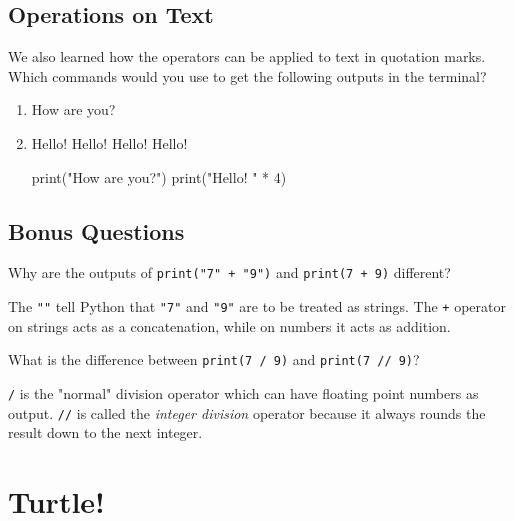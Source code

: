 \subsection{Operations on Text}

We also learned how the operators can be applied to text in quotation marks.
Which commands would you use to get the following outputs in the terminal?

\begin{enumerate}

\item How are you?
\item Hello! Hello! Hello! Hello!

\begin{solution}
    \begin{pythoncode}
print("How are you?")
print("Hello! " * 4)
    \end{pythoncode}
\end{solution}

\end{enumerate}

\subsection{Bonus Questions}

Why are the outputs of \texttt{print("7" + "9")} and \texttt{print(7 + 9)} different?

\vspace {1em}

\begin{solution}
    The \texttt{""} tell Python that \texttt{"7"} and \texttt{"9"} are to be treated as strings. The \texttt{+} operator on strings acts as a concatenation, while on numbers it acts as addition.
\end{solution}

\vspace{1em}

\noindent What is the difference between \texttt{print(7 / 9)} and \texttt{print(7 // 9)}?

\begin{solution}
    \texttt{/} is the "normal" division operator which can have floating point numbers as output. \texttt{//} is called the \textit{integer division} operator because it always rounds the result down to the next integer.
\end{solution}

\section{Turtle!}

